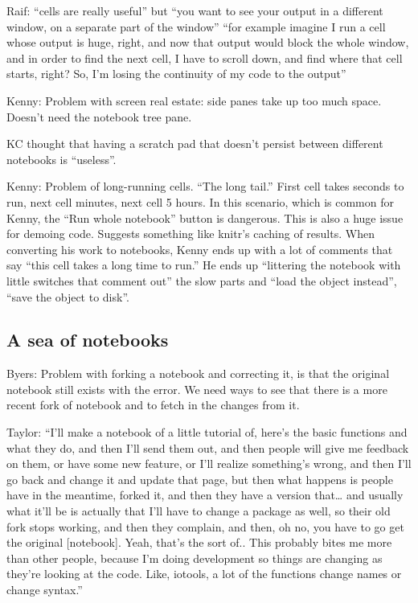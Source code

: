 Raif: ``cells are really useful'' but ``you want to see your output in a different window, on a separate part of the window'' ``for example imagine I run a cell whose output is huge, right, and now that output would block the whole window, and in order to find the next cell, I have to scroll down, and find where that cell starts, right? So, I'm losing the continuity of my code to the output''


Kenny: Problem with screen real estate: side panes take up too much space. Doesn't need the notebook tree pane.

KC thought that having a scratch pad that doesn't persist between different notebooks is ``useless''.

Kenny: Problem of long-running cells.  ``The long tail.''  First cell takes seconds to run, next cell minutes, next cell 5 hours.  In this scenario, which is common for Kenny, the ``Run whole notebook'' button is dangerous. This is also a huge issue for demoing code.  Suggests something like knitr's caching of results. When converting his work to notebooks, Kenny ends up with a lot of comments that say ``this cell takes a long time to run.'' He ends up ``littering the notebook with little switches that comment out'' the slow parts and ``load the object instead'', ``save the object to disk''.


\subsection{A sea of notebooks}

Byers: Problem with forking a notebook and correcting it, is that the original notebook still exists with the error.  We need ways to see that there is a more recent fork of notebook and to fetch in the changes from it.

Taylor: ``I'll make a notebook of a little tutorial of, here's the basic functions and what they do, and then I'll send them out, and then people will give me feedback on them, or have some new feature, or I'll realize something's wrong, and then I'll go back and change it and update that page, but then what happens is people have in the meantime, forked it, and then they have a version that… and usually what it'll be is actually that I'll have to change a package as well, so their old fork stops working, and then they complain, and then, oh no, you have to go get the original [notebook]. Yeah, that's the sort of.. This probably bites me more than other people, because I'm doing development so things are changing as they're looking at the code. Like, iotools, a lot of the functions change names or change syntax.''

